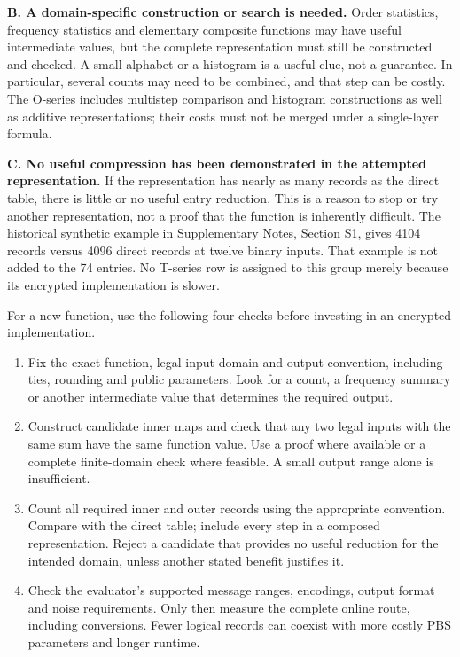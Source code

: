 \documentclass[a4paper,10pt]{article}
\newif\ifappmarked
\newcommand{\appadd}[1]{\ifappmarked{\color{blue}#1}\else#1\fi}
\begin{document}
\appadd{\textbf{B. A domain-specific construction or search is needed.} Order statistics, frequency statistics and elementary composite functions may have useful intermediate values, but the complete representation must still be constructed and checked. A small alphabet or a histogram is a useful clue, not a guarantee. In particular, several counts may need to be combined, and that step can be costly. The O-series includes multistep comparison and histogram constructions as well as additive representations; their costs must not be merged under a single-layer formula.}

\appadd{\textbf{C. No useful compression has been demonstrated in the attempted representation.} If the representation has nearly as many records as the direct table, there is little or no useful entry reduction. This is a reason to stop or try another representation, not a proof that the function is inherently difficult. The historical synthetic example in Supplementary Notes, Section S1, gives 4104 records versus 4096 direct records at twelve binary inputs. That example is not added to the 74 entries. No T-series row is assigned to this group merely because its encrypted implementation is slower.}

\appadd{For a new function, use the following four checks before investing in an encrypted implementation.}
\begin{enumerate}
\item \appadd{Fix the exact function, legal input domain and output convention, including ties, rounding and public parameters. Look for a count, a frequency summary or another intermediate value that determines the required output.}
\item \appadd{Construct candidate inner maps and check that any two legal inputs with the same sum have the same function value. Use a proof where available or a complete finite-domain check where feasible. A small output range alone is insufficient.}
\item \appadd{Count all required inner and outer records using the appropriate convention. Compare with the direct table; include every step in a composed representation. Reject a candidate that provides no useful reduction for the intended domain, unless another stated benefit justifies it.}
\item \appadd{Check the evaluator's supported message ranges, encodings, output format and noise requirements. Only then measure the complete online route, including conversions. Fewer logical records can coexist with more costly PBS parameters and longer runtime.}
\end{enumerate}
\end{document}
